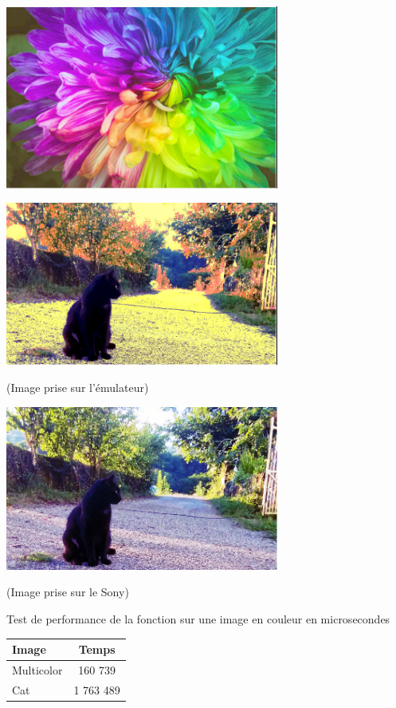 \documentclass{article}
\begin{document}
\begin{center} 
    \includegraphics[width=9cm]{../Image_fonctions/Multicolor/EgalisationColor.PNG}
\end{center}
\begin{center} 
    \includegraphics[width=9cm]{../Image_fonctions/Cat/EgalisationColor.PNG}
    
    (Image prise sur l'émulateur)
    
    \includegraphics[width=9cm]{../Image_fonctions/Cat/EgalisationColor2.PNG}
    
    (Image prise sur le Sony)
\end{center}

\begin{center}
\medbreak
Test de performance de la fonction sur une image en couleur en microsecondes
\bigbreak
   \begin{tabular}{ | l | c | }
     \hline
     Image & Temps \\
     \hline
     Multicolor & 160 739 \\
     \hline
     Cat & 1 763 489 \\
     \hline
   \end{tabular}
 \end{center}
\bigbreak
\end{document}
